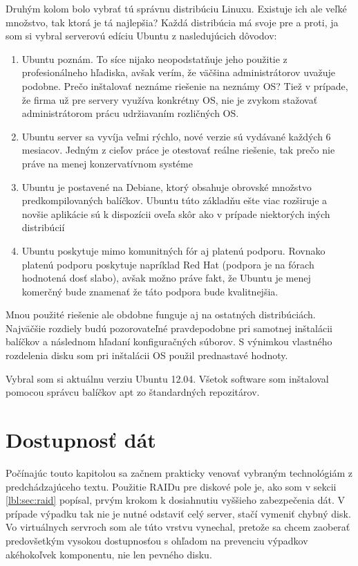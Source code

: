 Druhým kolom bolo vybrať tú správnu distribúciu Linuxu. Existuje ich ale veľké množstvo, tak ktorá je tá najlepšia? Každá distribúcia má svoje pre a proti, ja som si vybral serverovú edíciu Ubuntu z nasledujúcich dôvodov:

\begin{enumerate}
	\item Ubuntu poznám. To síce nijako neopodstatňuje jeho použitie z profesionálneho hľadiska, avšak verím, že väčšina administrátorov uvažuje podobne. Prečo inštalovať neznáme riešenie na neznámy OS? Tiež v prípade, že firma už pre servery využíva konkrétny OS, nie je zvykom stažovať administrátorom prácu udržiavaním rozličných OS.
	\item Ubuntu server sa vyvíja veľmi rýchlo, nové verzie sú vydávané každých 6 mesiacov. Jedným z cieľov práce je otestovať reálne riešenie, tak prečo nie práve na menej konzervatívnom systéme
	\item Ubuntu je postavené na Debiane, ktorý obsahuje obrovské množstvo predkompilovaných balíčkov. Ubuntu túto základňu ešte viac rozširuje a novšie aplikácie sú k dispozícii oveľa skôr ako v prípade niektorých iných distribúcií
	\item Ubuntu poskytuje mimo komunitných fór aj platenú podporu. Rovnako platenú podporu poskytuje napríklad Red Hat (podpora je na fórach hodnotená dosť slabo), avšak možno práve fakt, že Ubuntu je menej komerčný bude znamenať že táto podpora bude kvalitnejšia.
\end{enumerate}

Mnou použité riešenie ale obdobne funguje aj na ostatných distribúciách. Najväčšie rozdiely budú pozorovateľné pravdepodobne pri samotnej inštalácii balíčkov a následnom hľadaní konfiguračných súborov. S výnimkou vlastného rozdelenia disku som pri inštalácii OS použil prednastavé hodnoty.

Vybral som si aktuálnu verziu Ubuntu 12.04. Všetok software som inštaloval pomocou správcu balíčkov apt zo štandardných repozitárov.

\section{Dostupnosť dát} %

Počínajúc touto kapitolou sa začnem prakticky venovať vybraným technológiám z predchádzajúceho textu. Použitie RAIDu pre diskové pole je, ako som v sekcii \ref{lbl:sec:raid} popísal, prvým krokom k dosiahnutiu vyššieho zabezpečenia dát. V prípade výpadku tak nie je nutné odstaviť celý server, stačí vymeniť chybný disk. Vo virtuálnych servroch som ale túto vrstvu vynechal, pretože sa chcem zaoberať predovšetkým vysokou dostupnosťou s ohľadom na prevenciu výpadkov akéhokoľvek komponentu, nie len pevného disku.

